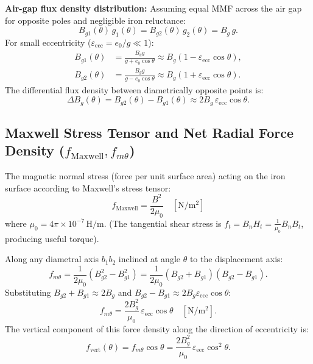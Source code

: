 \textbf{Air-gap flux density distribution:}
Assuming equal MMF across the air gap for opposite poles and negligible iron reluctance:
\begin{equation}
B_{g1}(\theta)\,g_1(\theta) = B_{g2}(\theta)\,g_2(\theta) = B_g\,g.
\end{equation}
For small eccentricity ($\varepsilon_{\mathrm{ecc}} = e_0/g \ll 1$):
\begin{align}
B_{g1}(\theta) &= \frac{B_g g}{g + e_0\cos\theta} \approx B_g(1 - \varepsilon_{\mathrm{ecc}}\cos\theta), \\
B_{g2}(\theta) &= \frac{B_g g}{g - e_0\cos\theta} \approx B_g(1 + \varepsilon_{\mathrm{ecc}}\cos\theta).
\end{align}
The differential flux density between diametrically opposite points is:
\begin{equation}
\Delta B_g(\theta) = B_{g2}(\theta) - B_{g1}(\theta) \approx 2 B_g\,\varepsilon_{\mathrm{ecc}}\cos\theta.
\end{equation}

\subsection{Maxwell Stress Tensor and Net Radial Force Density (\texorpdfstring{$f_{\mathrm{Maxwell}}, f_{m\theta}$}{f(Maxwell), f(m,theta)})}
The magnetic normal stress (force per unit surface area) acting on the iron surface according to Maxwell's stress tensor:
\begin{equation}
\boxed{f_{\mathrm{Maxwell}} = \frac{B^2}{2\mu_0} \quad [\mathrm{N/m^2}]}
\end{equation}
where $\mu_0 = 4\pi\times 10^{-7}\,\mathrm{H/m}$. (The tangential shear stress is $f_t = B_n H_t = \frac{1}{\mu_0}B_n B_t$, producing useful torque).

Along any diametral axis $b_1 b_2$ inclined at angle $\theta$ to the displacement axis:
\begin{equation}
f_{m\theta} = \frac{1}{2\mu_0}\left(B_{g2}^2 - B_{g1}^2\right) = \frac{1}{2\mu_0}\left(B_{g2} + B_{g1}\right)\left(B_{g2} - B_{g1}\right).
\end{equation}
Substituting $B_{g2} + B_{g1} \approx 2B_g$ and $B_{g2} - B_{g1} \approx 2B_g\varepsilon_{\mathrm{ecc}}\cos\theta$:
\begin{equation}
f_{m\theta} = \frac{2 B_g^2}{\mu_0}\,\varepsilon_{\mathrm{ecc}}\cos\theta \quad [\mathrm{N/m^2}].
\end{equation}
The vertical component of this force density along the direction of eccentricity is:
\begin{equation}
f_{\mathrm{vert}}(\theta) = f_{m\theta}\cos\theta = \frac{2 B_g^2}{\mu_0}\,\varepsilon_{\mathrm{ecc}}\cos^2\theta.
\end{equation}

